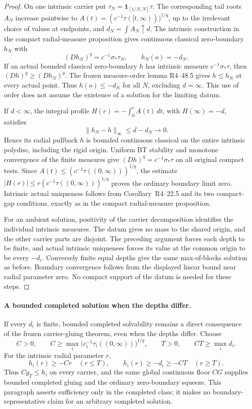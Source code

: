 \documentclass[11pt,a4paper]{article}
\numberwithin{equation}{section}
\theoremstyle{definition}
\theoremstyle{remark}
\begin{document}
\begin{proof}
On one intrinsic carrier put $\tau_N=\mathbf1_{[1/N,N]}\tau$.
The corresponding tail roots $A_N$ increase pointwise to
$A(t)=(c^{-1}\tau([t,\infty)))^{1/q}$, up to the irrelevant
choice of values at endpoints, and $d_N=\int A_N\uparrow d$.
The intrinsic construction in the compact radial-measure proposition gives continuous
classical zero-boundary $h_N$ with
\[
          (Dh_N)^q=c^{-1}\sigma_*\tau_N,
          \qquad h_N(o)=-d_N.
\]
If an actual bounded classical zero-boundary $h$ has intrinsic
measure $c^{-1}\sigma_*\tau$, then
$(Dh)^q\ge(Dh_N)^q$. The frozen measure-order lemma
\textup{R4--48.5} gives $h\le h_N$ at every actual
point. Thus $h(o)\le-d_N$ for all $N$, excluding $d=\infty$.
This use of order does not assume the existence of a solution for
the limiting datum.

If $d<\infty$, the integral profile
$H(r)=-\int_0^r A(t)\,dt$, with $H(\infty)=-d$, satisfies
\[
                         \|h_N-h\|_\infty\le d-d_N\longrightarrow0.
\]
Hence its radial pullback $h$ is bounded continuous classical on
the entire intrinsic polydisc, including the rigid origin. Uniform
BT stability and monotone convergence of the finite measures give
$(Dh)^q=c^{-1}\sigma_*\tau$ on all original compact tests.
Since $A(t)\le(c^{-1}\tau((0,\infty)))^{1/q}$, the estimate
$|H(r)|\le r(c^{-1}\tau((0,\infty)))^{1/q}$ proves the ordinary
boundary limit zero. Intrinsic actual uniqueness follows from
Corollary~\textup{R4--22.5} and its two compact-gap
conditions, exactly as in the compact radial-measure proposition.

For an ambient solution, positivity of the carrier decomposition
identifies the individual intrinsic measures. The datum gives no
mass to the shared origin, and the other carrier parts are disjoint.
The preceding argument forces each depth to be finite, and actual
intrinsic uniqueness forces its value at the common origin to be
every $-d_i$. Conversely finite equal depths give the same
max-of-blocks solution as before. Boundary convergence follows from
the displayed linear bound near radial parameter zero. No compact
support of the datum is needed for these steps.
\end{proof}

\paragraph{A bounded completed solution when the depths differ.}
If every $d_i$ is finite, bounded completed solvability remains a
direct consequence of the frozen carrier-gluing theorem, even when
the depths differ. Choose
\[
 C>0,\qquad
 C\ge\max_i\bigl(c_i^{-1}\tau_i((0,\infty))\bigr)^{1/q},
 \qquad T>0,\qquad CT\ge\max_i d_i.
\]
For the
intrinsic radial parameter $r$,
\[
 h_i(r)\ge-Cr\quad(r\le T),\qquad
 h_i(r)\ge-d_i\ge-CT\quad(r\ge T).
\]
Thus $C g_T\le h_i$ on every carrier, and the same global
continuous floor $CG$ supplies bounded completed gluing and the
ordinary zero-boundary squeeze. This paragraph asserts sufficiency
only in the completed class; it makes no boundary-representative
claim for an arbitrary completed solution.
\end{document}
